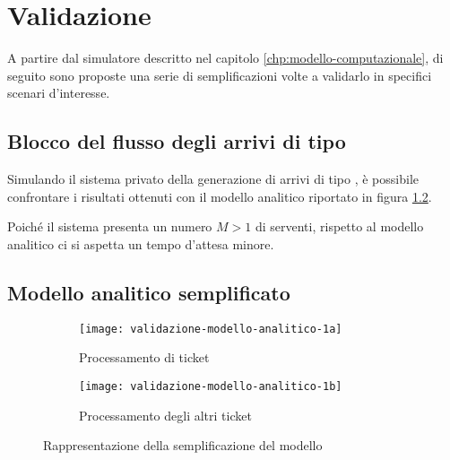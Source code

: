 \chapter{Validazione}\label{chp:validazione}
A partire dal simulatore descritto nel capitolo \ref{chp:modello-computazionale}, di seguito sono proposte una serie di semplificazioni volte a validarlo in specifici scenari d'interesse.
\section{Blocco del flusso degli arrivi di tipo \sr{}}
Simulando il sistema privato della generazione di arrivi di tipo \sr{}, è possibile confrontare i risultati ottenuti con il modello analitico riportato in figura \ref{fig:validazione-modello-analitico-1b}.

Poiché il sistema presenta un numero $M>1$ di serventi, rispetto al modello analitico ci si aspetta un tempo d'attesa minore.
\section{Modello analitico semplificato}
\begin{figure}[ht]
\centering
\begin{subfigure}[b]{0.475\textwidth}
\centering
\texttt{[image: validazione-modello-analitico-1a]}
\caption{Processamento di ticket \sr{}}    
\label{fig:validazione-modello-analitico-1a}
\end{subfigure}
\hfill 
\begin{subfigure}[b]{0.475\textwidth}  
\centering 
\texttt{[image: validazione-modello-analitico-1b]}
\caption{Processamento degli altri ticket}    
\label{fig:validazione-modello-analitico-1b}
\end{subfigure}
\caption{Rappresentazione della semplificazione del modello}
\label{fig:validazione-modello-analitico-1}
\end{figure}

